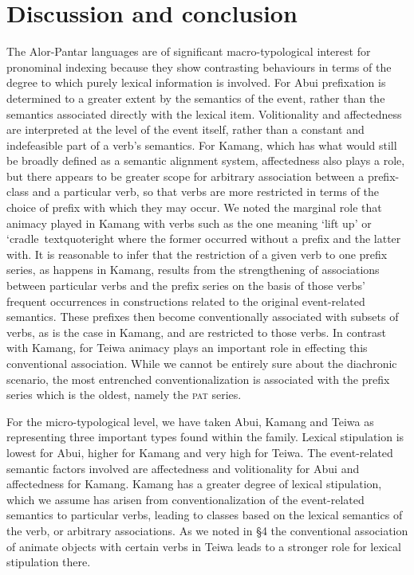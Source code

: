 \section[Discussion and conclusion]{Discussion and conclusion}
The Alor-Pantar languages are of significant macro-typological interest for pronominal indexing because they show contrasting behaviours in terms of the degree to which purely lexical information is involved. For Abui prefixation is determined to a greater extent by the semantics of the event, rather than the semantics associated directly with the lexical item. Volitionality and affectedness are interpreted at the level of the event itself, rather than a constant and indefeasible part of a verb{\textquoteright}s semantics. For Kamang, which has what would still be broadly defined as a semantic alignment system, affectedness also plays a role, but there appears to be greater scope for arbitrary association between a prefix-class and a particular verb, so that verbs are more restricted in terms of the choice of prefix with which they may occur. We noted the marginal role that animacy played in Kamang with verbs such as the one meaning {\textquoteleft}lift up{\textquoteright} or {\textquoteleft}cradle{\
textquoteright} where the former occurred without a prefix and the latter with. It is reasonable to infer that the restriction of a given verb to one prefix series, as happens in Kamang, results from the strengthening of associations between particular verbs and the prefix series on the basis of those verbs{\textquoteright} frequent occurrences in constructions related to the original event-related semantics. These prefixes then become conventionally associated with subsets of verbs, as is the case in Kamang, and are restricted to those verbs. In contrast with Kamang, for Teiwa animacy plays an important role in effecting this conventional association. While we cannot be entirely sure about the diachronic scenario, the most entrenched conventionalization is associated with the prefix series which is the oldest, namely the \textsc{pat} series.

For the micro-typological level, we have taken Abui, Kamang and Teiwa as representing three important types found within the family. Lexical stipulation is lowest for Abui, higher for Kamang and very high for Teiwa. The event-related semantic factors involved are affectedness and volitionality for Abui and affectedness for Kamang. Kamang has a greater degree of lexical stipulation, which we assume has arisen from conventionalization of the event-related semantics to particular verbs, leading to classes based on the lexical semantics of the verb, or arbitrary associations. As we noted in {\S}4 the conventional association of animate objects with certain verbs in Teiwa leads to a stronger role for lexical stipulation there. 

